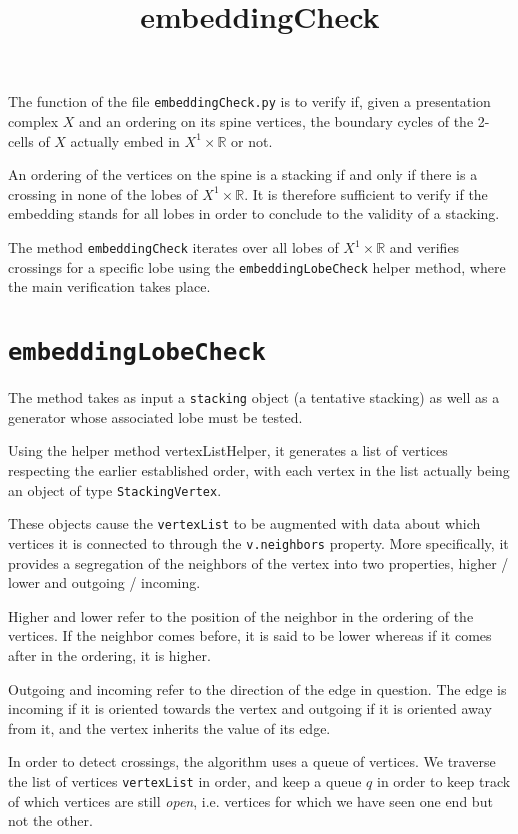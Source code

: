 \documentclass[12pt, letterpaper]{article}
\title{embeddingCheck}
\begin{document}
The function of the file \texttt{embeddingCheck.py} is to verify if, given a presentation complex $X$ and an ordering on its spine vertices, the boundary cycles of the 2-cells of $X$ actually embed in $X^1 \times \mathbb{R}$ or not.

An ordering of the vertices on the spine is a stacking if and only if there is a crossing in none of the lobes of $X^1 \times \mathbb{R}$. It is therefore sufficient to verify if the embedding stands for all lobes in order to conclude to the validity of a stacking.

The method \texttt{embeddingCheck} iterates over all lobes of $X^1 \times \mathbb{R}$ and verifies crossings for a specific lobe using the \texttt{embeddingLobeCheck} helper method, where the main verification takes place.

\section{\texttt{embeddingLobeCheck}}

    The method takes as input a \texttt{stacking} object (a tentative stacking) as well as a generator whose associated lobe must be tested.
    
    Using the helper method vertexListHelper, it generates a list of vertices respecting the earlier established order, with each vertex in the list actually being an object of type \texttt{StackingVertex}.
    
    These objects cause the \texttt{vertexList} to be augmented with data about which vertices it is connected to through the \texttt{v.neighbors} property. More specifically, it provides a segregation of the neighbors of the vertex into two properties, higher / lower and outgoing / incoming.
    
    Higher and lower refer to the position of the neighbor in the ordering of the vertices. If the neighbor comes before, it is said to be lower whereas if it comes after in the ordering, it is higher.
    
    Outgoing and incoming refer to the direction of the edge in question. The edge is incoming if it is oriented towards the vertex and outgoing if it is oriented away from it, and the vertex inherits the value of its edge.
    
    In order to detect crossings, the algorithm uses a queue of vertices. We traverse the list of vertices \texttt{vertexList} in order, and keep a queue $q$ in order to keep track of which vertices are still \emph{open}, i.e. vertices for which we have seen one end but not the other.
    
\end{document}
